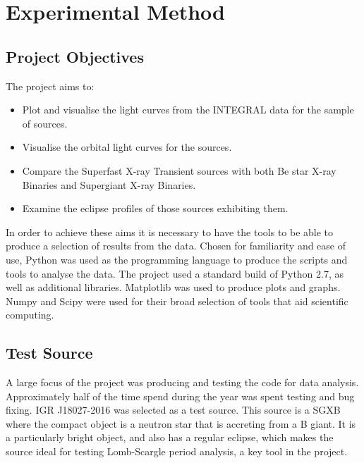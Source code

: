 
\chapter{Experimental Method} %

\label{ch:theoretical} %

\section{Project Objectives}
The project aims to:
\begin{itemize}
\item Plot and visualise the light curves from the INTEGRAL data for the sample of sources.
\item Visualise the orbital light curves for the sources.
\item Compare the Superfast X-ray Transient sources with both Be star X-ray Binaries and Supergiant X-ray Binaries. 
\item Examine the eclipse profiles of those sources exhibiting them.
\end{itemize}
In order to achieve these aims it is necessary to have the tools to be able to produce a selection of results from the data. Chosen for familiarity and ease of use, Python was used as the programming language to produce the scripts and tools to analyse the data. The project used a standard build of Python 2.7, as well as additional libraries. Matplotlib was used to produce plots and graphs. Numpy and Scipy were used for their broad selection of tools that aid scientific computing.

\section{Test Source}
A large focus of the project was producing and testing the code for data analysis. Approximately half of the time spend during the year was spent testing and bug fixing. IGR J18027-2016 was selected as a test source. This source is a SGXB where the compact object is a neutron star that is accreting from a B giant. It is a particularly bright object, and also has a regular eclipse, which makes the source ideal for testing Lomb-Scargle period analysis, a key tool in the project. 

